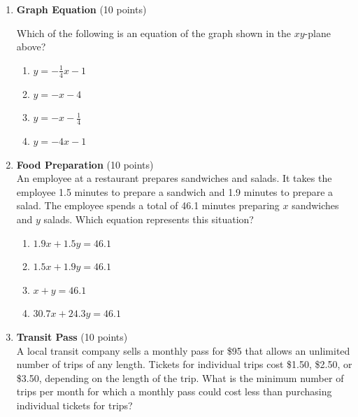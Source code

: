 \begin{enumerate}
  \item \textbf{Graph Equation} (10 points)\\

  Which of the following is an equation of the graph shown in the $xy$-plane above?\\
  \begin{enumerate}[label=(\Alph*)]
    \item $y=-\frac{1}{4}x-1$
    \item $y=-x-4$
    \item $y=-x-\frac{1}{4}$
    \item $y=-4x-1$
  \end{enumerate}
  \begin{subanswer}
  \end{subanswer}

  \item \textbf{Food Preparation} (10 points)\\
  An employee at a restaurant prepares sandwiches and salads. It takes the employee 1.5 minutes to prepare a sandwich and 1.9 minutes to prepare a salad. The employee spends a total of 46.1 minutes preparing $x$ sandwiches and $y$ salads. Which equation represents this situation?\\
  \begin{enumerate}[label=(\Alph*)]
    \item $1.9x+1.5y=46.1$
    \item $1.5x+1.9y=46.1$
    \item $x+y=46.1$
    \item $30.7x+24.3y=46.1$
  \end{enumerate}
  \begin{subanswer}
  \end{subanswer}

  \item \textbf{Transit Pass} (10 points)\\
  A local transit company sells a monthly pass for \$95 that allows an unlimited number of trips of any length. Tickets for individual trips cost \$1.50, \$2.50, or \$3.50, depending on the length of the trip. What is the minimum number of trips per month for which a monthly pass could cost less than purchasing individual tickets for trips?
  \begin{subanswer}
  \end{subanswer}


\end{enumerate}
